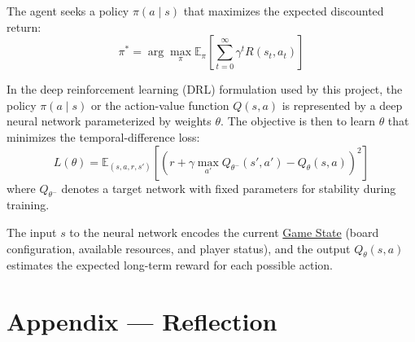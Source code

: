 \documentclass{article}
\newcommand{\GameState}{\href{https://milvus.io/ai-quick-reference/what-is-a-state-in-rl}{Game State}}
\begin{document}
The agent seeks a policy $\pi(a \mid s)$ that maximizes the expected discounted return:
\[
\pi^* = \arg\max_{\pi} \mathbb{E}_{\pi}\left[\sum_{t=0}^{\infty} \gamma^t R(s_t, a_t)\right]
\]

In the deep reinforcement learning (DRL) formulation used by this project, the policy $\pi(a \mid s)$ or the action-value function $Q(s, a)$ is represented by a deep neural network parameterized by weights $\theta$. The objective is then to learn $\theta$ that minimizes the temporal-difference loss:
\[
L(\theta) = \mathbb{E}_{(s, a, r, s')} \left[ \left( r + \gamma \max_{a'} Q_{\theta^-}(s', a') - Q_{\theta}(s, a) \right)^2 \right]
\]
where $Q_{\theta^-}$ denotes a target network with fixed parameters for stability during training.

The input $s$ to the neural network encodes the current \GameState{} (board configuration, available resources, and player status), and the output $Q_{\theta}(s, a)$ estimates the expected long-term reward for each possible action.

\newpage{}



\section*{Appendix --- Reflection}

\end{document}

